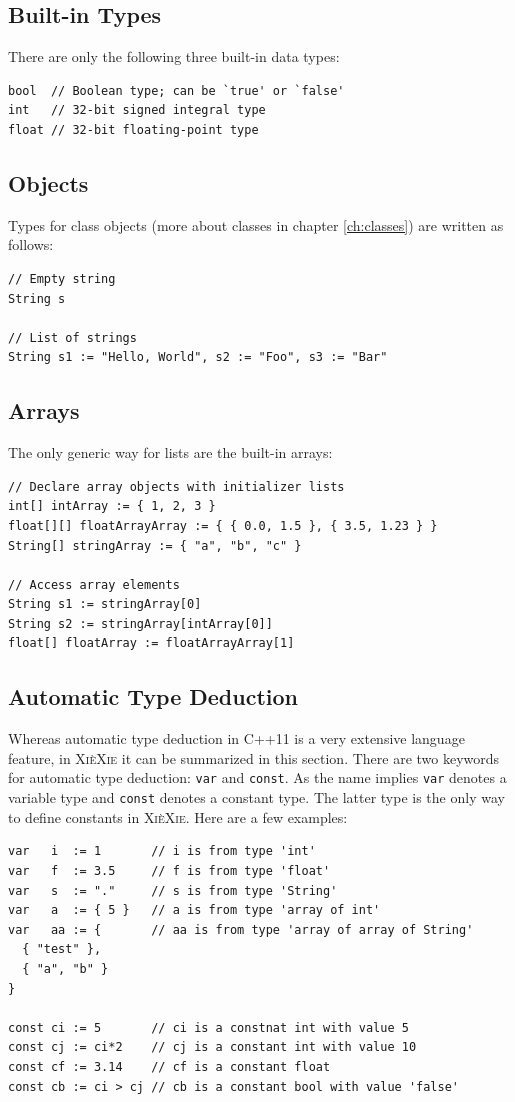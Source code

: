 \documentclass{report}
\def\xiexie{\textsc{Xi\`eXie}\xspace}
\def\cppx{\textsc{C++11}\xspace}
\begin{document}
\subsection{Built-in Types}

There are only the following three built-in data types:
\begin{lstlisting}
bool  // Boolean type; can be `true' or `false'
int   // 32-bit signed integral type
float // 32-bit floating-point type
\end{lstlisting}

\subsection{Objects}

Types for class objects (more about classes in chapter \ref{ch:classes}) are written as follows:
\begin{lstlisting}
// Empty string
String s

// List of strings
String s1 := "Hello, World", s2 := "Foo", s3 := "Bar"
\end{lstlisting}

\subsection{Arrays}

The only generic way for lists are the built-in arrays:
\begin{lstlisting}
// Declare array objects with initializer lists
int[] intArray := { 1, 2, 3 }
float[][] floatArrayArray := { { 0.0, 1.5 }, { 3.5, 1.23 } }
String[] stringArray := { "a", "b", "c" }

// Access array elements
String s1 := stringArray[0]
String s2 := stringArray[intArray[0]]
float[] floatArray := floatArrayArray[1]
\end{lstlisting}

\subsection{Automatic Type Deduction}

Whereas automatic type deduction in \cppx is a very extensive language feature,
in \xiexie it can be summarized in this section.
There are two keywords for automatic type deduction: \texttt{var} and \texttt{const}. As the name implies
\texttt{var} denotes a variable type and \texttt{const} denotes a constant type. The latter type is the only way
to define constants in \xiexie. Here are a few examples:
\begin{lstlisting}
var   i  := 1       // i is from type 'int'
var   f  := 3.5     // f is from type 'float'
var   s  := "."     // s is from type 'String'
var   a  := { 5 }   // a is from type 'array of int'
var   aa := {       // aa is from type 'array of array of String'
  { "test" },
  { "a", "b" }
}

const ci := 5       // ci is a constnat int with value 5
const cj := ci*2    // cj is a constant int with value 10
const cf := 3.14    // cf is a constant float
const cb := ci > cj // cb is a constant bool with value 'false'
\end{lstlisting}
\end{document}
